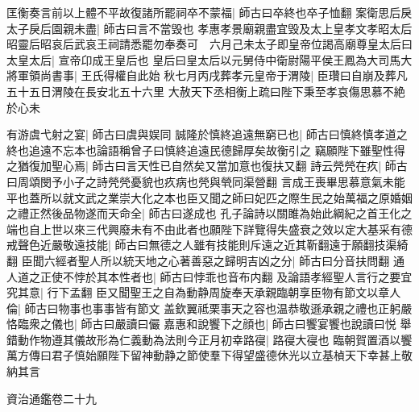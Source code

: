 匡衡奏言前以上體不平故復諸所罷祠卒不蒙福|{
	師古曰卒終也卒子恤翻}
案衛思后戾太子戾后園親未盡|{
	師古曰言不當毁也}
孝惠孝景廟親盡宜毁及太上皇孝文孝昭太后昭靈后昭哀后武哀王祠請悉罷勿奉奏可　六月己未太子即皇帝位謁高廟尊皇太后曰太皇太后|{
	宣帝卬成王皇后也}
皇后曰皇太后以元舅侍中衛尉陽平侯王鳳為大司馬大將軍領尚書事|{
	王氏得權自此始}
秋七月丙戌葬孝元皇帝于渭陵|{
	臣瓚曰自崩及葬凡五十五日渭陵在長安北五十六里}
大赦天下丞相衡上疏曰陛下秉至孝哀傷思慕不絶於心未

有游虞弋射之宴|{
	師古曰虞與娱同}
誠隆於慎終追遠無窮已也|{
	師古曰慎終慎孝道之終也追遠不忘本也論語稱曾子曰慎終追遠民德歸厚矣故衡引之}
竊願陛下雖聖性得之猶復加聖心焉|{
	師古曰言天性已自然矣又當加意也復扶又翻}
詩云焭焭在疚|{
	師古曰周頌閔予小子之詩焭焭憂貌也疚病也焭與煢同渠營翻}
言成王喪畢思慕意氣未能平也蓋所以就文武之業崇大化之本也臣又聞之師曰妃匹之際生民之始萬福之原婚姻之禮正然後品物遂而天命全|{
	師古曰遂成也}
孔子論詩以關雎為始此綱紀之首王化之端也自上世以來三代興廢未有不由此者也願陛下詳覽得失盛衰之效以定大基采有德戒聲色近嚴敬遠技能|{
	師古曰無德之人雖有技能則斥遠之近其靳翻遠于願翻技渠綺翻}
臣聞六經者聖人所以統天地之心著善惡之歸明吉凶之分|{
	師古曰分音扶問翻}
通人道之正使不悖於其本性者也|{
	師古曰悖乖也音布内翻}
及論語孝經聖人言行之要宜究其意|{
	行下孟翻}
臣又聞聖王之自為動静周旋奉天承親臨朝享臣物有節文以章人倫|{
	師古曰物事也事事皆有節文}
盖欽翼祗栗事天之容也温恭敬遜承親之禮也正躬嚴恪臨衆之儀也|{
	師古曰嚴讀曰儼}
嘉惠和說饗下之顔也|{
	師古曰饗宴饗也說讀曰悦}
舉錯動作物遵其儀故形為仁義動為法則今正月初幸路寑|{
	路寑大寑也}
臨朝賀置酒以饗萬方傳曰君子慎始願陛下留神動静之節使羣下得望盛德休光以立基楨天下幸甚上敬納其言

資治通鑑卷二十九
